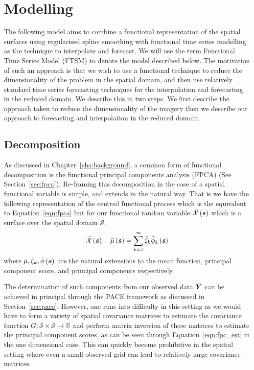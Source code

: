 \section{Modelling \label{sec:ftsm_model}}
The following model aims to combine a functional representation of the spatial surfaces using regularised spline smoothing with functional time series modelling as the technique to interpolate and forecast. We will use the term Functional Time Series Model (FTSM) to denote the model described below. 
The motivation of such an approach is that we wish to use a functional technique to reduce the dimensionality of the problem in the spatial domain, and then use relatively standard time series forecasting techniques for the interpolation and forecasting in the reduced domain.
We describe this in two steps.
We first describe the approach taken to reduce the dimensionality of the imagery then we describe our approach to forecasting and interpolation in the reduced domain.

\subsection{Decomposition}
As discussed in Chapter~\ref{cha:background}, a common form of functional decomposition is the functional principal components analysis (FPCA) (See Section~\ref{sec:fpca}).
Re-framing this decomposition in the case of a spatial functional variable is simple, and extends in the natural way.
That is we have the following representation of the centred functional process which is the equivalent to Equation~\ref{eqn:fpca} but for our functional random variable $\bar{\mathcal{X}}\left(\bm{{s}}\right)$ which is a surface over the spatial domain $\mathcal{S}$.
\begin{equation}
	\bar{\mathcal{X}}\left(\bm{{s}}\right) -\bar{\mu}\left(\bm{{s}}\right) = \sum_{k=1}^{\infty} \bar{\zeta}_k \bar{\phi}_k \left( \bm{{s}} \right)
	\label{eqn:space_fpca}
\end{equation}
where $\bar{\mu}, \bar{\zeta}_k, \bar{\phi}\left(\bm{{s}}\right)$ are the natural extensions to the mean function, principal component score, and principal components respectively. 

The determination of such components from our observed data $\bar{\bm{{Y}}}$ can be achieved in principal through the PACE framework as discussed in Section~\ref{sec:pace}.
However, one runs into difficulty in this setting as we would have to form a variety of spatial covariance matrices to estimate the covariance function $G: \mathcal{S} \times \mathcal{S} \to \mathbb{R}$ and perform matrix inversion of these matrices to estimate the principal component scores, as can be seen through Equation~\ref{eqn:fpc_est} in the one dimensional case.
This can quickly become prohibitive in the spatial setting where even a small observed grid can lead to relatively large covariance matrices. 

